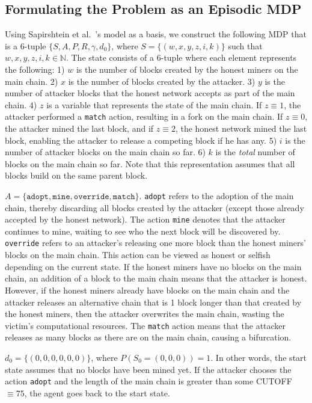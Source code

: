 \subsection{Formulating the Problem as an Episodic MDP}
 Using Sapirshtein et al.~\cite{sapirshtein:2015}'s model as a basis, we construct the following MDP that is a 6-tuple $\{S, A, P, R, \gamma, d_0\}$, where $S = \{(w, x, y, z, i, k)\}$ such that $w, x, y, z, i, k \in \mathbb{N}$. The state consists of a 6-tuple where each element represents the following: 1) $w$ is the number of blocks created by the honest miners on the main chain. 2) $x$ is the number of blocks created by the attacker. 3) $y$ is the number of attacker blocks that the honest network accepts as part of the main chain. 4) $z$ is a variable that represents the state of the main chain. If $z \equiv 1$, the attacker performed a {\tt match} action, resulting in a fork on the main chain. If $z \equiv 0$, the attacker mined the last block, and if $z \equiv 2$, the honest network mined the last block, enabling the attacker to release a competing block if he has any. 5) $i$ is the number of attacker blocks on the main chain so far. 6) $k$ is the {\em total} number of blocks on the main chain so far. Note that this representation assumes that all blocks build on the same parent block.

 $A = \{\texttt{adopt}, \texttt{mine}, \texttt{override}, \texttt{match}\}$. \texttt{adopt} refers to the adoption of the main chain, thereby discarding all blocks created by the attacker (except those already accepted by the honest network). The action \texttt{mine} denotes that the attacker continues to mine, waiting to see who the next block will be discovered by. \texttt{override} refers to an attacker's releasing one more block than the honest miners' blocks on the main chain. This action can be viewed as honest or selfish depending on the current state. If the honest miners have no blocks on the main chain, an addition of a block to the main chain means that the attacker is honest. However, if the honest miners already have blocks on the main chain and the attacker releases an alternative chain that is 1 block longer than that created by the honest miners, then the attacker overwrites the main chain, wasting the victim's computational resources. The \texttt{match} action means that the attacker releases as many blocks as there are on the main chain, causing a bifurcation.

 $d_0 = \{(0, 0, 0, 0, 0, 0)\}$, where $P(S_0 = (0, 0, 0)) = 1$. In other words, the start state assumes that no blocks have been mined yet. If the attacker chooses the action \texttt{adopt} and the length of the main chain is greater than some CUTOFF $\equiv 75$, the agent goes back to the start state.

